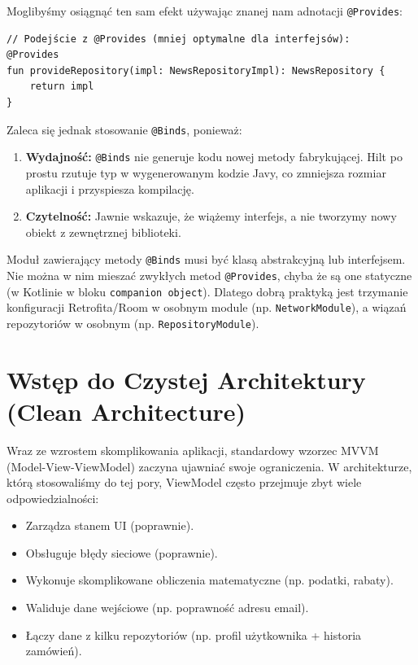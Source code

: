 Moglibyśmy osiągnąć ten sam efekt używając znanej nam adnotacji \texttt{@Provides}:

\begin{verbatim}
// Podejście z @Provides (mniej optymalne dla interfejsów):
@Provides
fun provideRepository(impl: NewsRepositoryImpl): NewsRepository {
    return impl
}
\end{verbatim}

Zaleca się jednak stosowanie \texttt{@Binds}, ponieważ:
\begin{enumerate}
    \item \textbf{Wydajność:} \texttt{@Binds} nie generuje kodu nowej metody fabrykującej. Hilt po prostu rzutuje typ w wygenerowanym kodzie Javy, co zmniejsza rozmiar aplikacji i przyspiesza kompilację.
    \item \textbf{Czytelność:} Jawnie wskazuje, że wiążemy interfejs, a nie tworzymy nowy obiekt z zewnętrznej biblioteki.
\end{enumerate}

Moduł zawierający metody \texttt{@Binds} musi być klasą abstrakcyjną lub interfejsem. Nie można w nim mieszać zwykłych metod \texttt{@Provides}, chyba że są one statyczne (w Kotlinie w bloku \texttt{companion object}). Dlatego dobrą praktyką jest trzymanie konfiguracji Retrofita/Room w osobnym module (np. \texttt{NetworkModule}), a wiązań repozytoriów w osobnym (np. \texttt{RepositoryModule}).

\section{Wstęp do Czystej Architektury (Clean Architecture)}

Wraz ze wzrostem skomplikowania aplikacji, standardowy wzorzec MVVM (Model-View-ViewModel) zaczyna ujawniać swoje ograniczenia. W architekturze, którą stosowaliśmy do tej pory, ViewModel często przejmuje zbyt wiele odpowiedzialności:
\begin{itemize}
    \item Zarządza stanem UI (poprawnie).
    \item Obsługuje błędy sieciowe (poprawnie).
    \item Wykonuje skomplikowane obliczenia matematyczne (np. podatki, rabaty).
    \item Waliduje dane wejściowe (np. poprawność adresu email).
    \item Łączy dane z kilku repozytoriów (np. profil użytkownika + historia zamówień).
\end{itemize}


